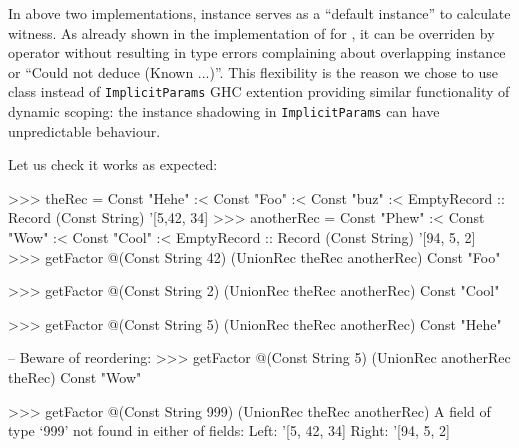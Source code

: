 \documentclass[demotion-paper.tex]{subfiles}
\begin{document}
In above two implementations,  instance serves as a ``default instance'' to calculate witness.
As already shown in the implementation of  for , it can be overriden by  operator without resulting in type errors complaining about overlapping instance or ``Could not deduce (Known ...)''.
This flexibility is the reason we chose to use  class instead of \texttt{ImplicitParams} GHC extention providing similar functionality of dynamic scoping:  the instance shadowing in \texttt{ImplicitParams} can have unpredictable behaviour.

Let us check it works as expected:

\begin{repl}
>>> theRec = Const "Hehe" :< Const "Foo" :< Const "buz" :< EmptyRecord
      :: Record (Const String) '[5,42, 34]
>>> anotherRec = Const "Phew" :< Const "Wow" :< Const "Cool" :< EmptyRecord
      :: Record (Const String) '[94, 5, 2]
>>> getFactor @(Const String 42) (UnionRec theRec anotherRec)
Const "Foo"

>>> getFactor @(Const String 2) (UnionRec theRec anotherRec)
Const "Cool"

>>> getFactor @(Const String 5) (UnionRec theRec anotherRec)
Const "Hehe"

-- Beware of reordering:
>>> getFactor @(Const String 5) (UnionRec anotherRec theRec)
Const "Wow"

>>> getFactor @(Const String 999) (UnionRec theRec anotherRec)
A field of type `999' not found in either of fields:
   Left: '[5, 42, 34]
  Right: '[94, 5, 2]  
\end{repl}
\end{document}
